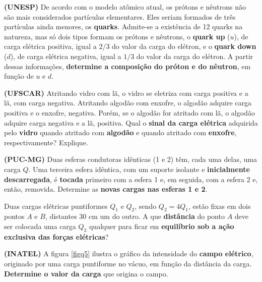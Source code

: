 \documentclass{yagoexam}
\begin{document}
	\begin{questions}
		
		\question[10]
		\textbf{(UNESP)} De acordo com o modelo atômico atual, os prótons e nêutrons não são mais considerados partículas elementares. Eles seriam formados de três partículas ainda menores, os \textbf{quarks}. Admite-se a existência de 12 quarks na natureza, mas só dois tipos formam os prótons e nêutrons, o \textbf{quark up} ($u$), de carga elétrica positiva, igual a $2/3$ do valor da carga do elétron, e o \textbf{quark down} ($d$), de carga elétrica negativa, igual a $1/3$ do valor da carga do elétron. A partir dessas informações, \textbf{determine a composição do próton e do nêutron}, em função de $u$ e $d$.
		
		
		\vspace{4cm}
		
		\question[10]
		\textbf{(UFSCAR)} Atritando vidro com lã, o vidro se eletriza com carga positiva e a lã, com carga negativa. Atritando algodão com enxofre, o algodão adquire carga positiva e o enxofre, negativa. Porém, se o algodão for atritado com lã, o algodão adquire carga negativa e a lã, positiva. Qual o \textbf{sinal da carga elétrica} adquirida pelo \textbf{vidro} quando atritado com \textbf{algodão} e quando atritado com \textbf{enxofre}, respectivamente? Explique.
		
		
		\vspace{4cm}
		
		\question[10]
		\textbf{(PUC-MG)} Duas esferas condutoras idênticas (1 e 2) têm, cada uma delas, uma carga $Q$. Uma terceira esfera idêntica, com um suporte isolante e \textbf{inicialmente descarregada}, é \textbf{tocada} primeiro com a esfera 1 e, em seguida, com a esfera 2 e, então, removida. Determine as \textbf{novas cargas nas esferas 1 e 2}.
		
		
		
		\newpage
		
		
		\question[10]
		Duas cargas elétricas puntiformes $Q_1$ e $Q_2$, sendo $Q_2 = 4 Q_1$, estão fixas em dois pontos $A$ e $B$, distantes $30$ cm um do outro. A que \textbf{distância} do ponto $A$ deve ser colocada uma carga $Q_3$ qualquer para ficar em \textbf{equilíbrio sob a ação exclusiva das forças elétricas}?
		
		
		\vspace{7cm}
		
		
		\question[10]
		\textbf{(INATEL)} A figura \ref{figq5} ilustra o gráfico da intensidade do \textbf{campo elétrico}, originado por uma carga puntiforme no vácuo, em função da distância da carga. \textbf{Determine o valor da carga} que origina o campo.
		

\end{questions}
\end{document}
